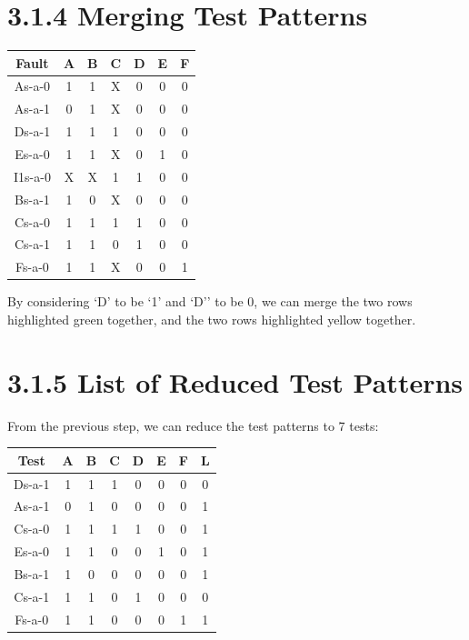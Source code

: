 \documentclass[11pt]{report}
\begin{document}
\section*{3.1.4 Merging Test Patterns}
\begin{tabular}{|c||c|c|c|c|c|c|}
\hline
Fault & A & B & C & D & E & F \\
\hline
\hline
\rowcolor{green!50}As-a-0 & 1 & 1 & X & 0 & 0 & 0 \\
\hline
As-a-1 & 0 & 1 & X & 0 & 0 & 0 \\
\hline
\rowcolor{green!50}Ds-a-1 & 1 & 1 & 1 & 0 & 0 & 0 \\
\hline
Es-a-0 & 1 & 1 & X & 0 & 1 & 0 \\
\hline
\rowcolor{yellow!50}I1s-a-0 & X & X & 1 & 1 & 0 & 0 \\
\hline
Bs-a-1 & 1 & 0 & X & 0 & 0 & 0 \\
\hline
\rowcolor{yellow!50}Cs-a-0 & 1 & 1 & 1 & 1 & 0 & 0 \\
\hline
Cs-a-1 & 1 & 1 & 0 & 1 & 0 & 0 \\
\hline
Fs-a-0 & 1 & 1 & X & 0 & 0 & 1 \\
\hline
\end{tabular}

By considering `D' to be `1' and `D'' to be 0, we can merge the two rows highlighted green together, and the two rows highlighted yellow together.


\section*{3.1.5 List of Reduced Test Patterns}
From the previous step, we can reduce the test patterns to 7 tests:

\begin{tabular}{|c||c|c|c|c|c|c|c|}
\hline
Test & A & B & C & D & E & F & L \\
\hline
\hline
Ds-a-1 & 1 & 1 & 1 & 0 & 0 & 0 & 0 \\
\hline
As-a-1 & 0 & 1 & 0 & 0 & 0 & 0 & 1 \\
\hline
Cs-a-0 & 1 & 1 & 1 & 1 & 0 & 0 & 1 \\
\hline
Es-a-0 & 1 & 1 & 0 & 0 & 1 & 0 & 1 \\
\hline
Bs-a-1 & 1 & 0 & 0 & 0 & 0 & 0 & 1 \\
\hline
Cs-a-1 & 1 & 1 & 0 & 1 & 0 & 0 & 0 \\
\hline
Fs-a-0 & 1 & 1 & 0 & 0 & 0 & 1 & 1 \\
\hline
\end{tabular}
\end{document}
